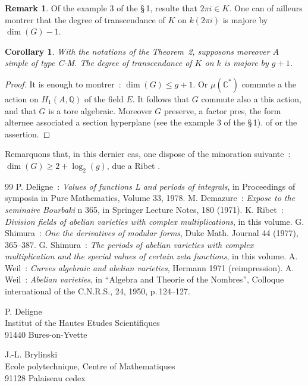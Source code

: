 \documentclass[12pt,a4paper]{article}
\theoremstyle{plain}
\newtheorem{corollary}{Corollary}
\theoremstyle{definition}
\newtheorem{remark}{Remark}
\theoremstyle{remark}
\newcommand{\QQ}{\mathbb{Q}}
\newcommand{\CC}{\mathbb{C}}
\providecommand{\CC}{\mathbb{C}}
\providecommand{\QQ}{\mathbb{Q}}
\begin{document}
\begin{remark}
Of the example 3 of the \S\,1, resulte that $2\pi i \in K$. One can of ailleurs montrer that the degree of transcendance of $K$ on $k(2\pi i)$ is majore by $\dim(G) - 1$.
\end{remark}

\begin{corollary}
With the notations of the Theorem~2, supposons moreover $A$ simple of type C-M. The degree of transcendance of $K$ on $k$ is majore by $g + 1$.
\end{corollary}

\begin{proof}[Proof]
It is enough to montrer~: $\dim(G) \leq g + 1$. Or $\mu(\CC^*)$ commute a the action on $H_1(A, \QQ)$ of the field $E$. It follows that $G$ commute also a this action, and that $G$ is a tore algebraic. Moreover $G$ preserve, a factor pres, the form alternee associated a section hyperplane (see the example 3 of the \S\,1). of or the assertion.
\end{proof}

Remarquons that, in this dernier cas, one dispose of the minoration suivante~: $\dim(G) \geq 2 + \log_2(g)$, due a Ribet \cite{Ribet}.

\begin{thebibliography}{99}
 P. Deligne~: \textit{Values of functions L and periods of integrals}, in Proceedings of symposia in Pure Mathematics, Volume 33, 1978.
 M. Demazure~: \textit{Expose to the seminaire Bourbaki} n 365, in Springer Lecture Notes, 180 (1971).
 K. Ribet~: \textit{Division fields of abelian varieties with complex multiplications}, in this volume.
 G. Shimura~: \textit{One the derivatives of modular forms}, Duke Math. Journal 44 (1977), 365--387.
 G. Shimura~: \textit{The periods of abelian varieties with complex multiplication and the special values of certain zeta functions}, in this volume.
 A. Weil~: \textit{Curves algebraic and abelian varieties}, Hermann 1971 (reimpression).
 A. Weil~: \textit{Abelian varieties}, in ``Algebra and Theorie of the Nombres'', Colloque international of the C.N.R.S., 24, 1950, p.\,124--127.
\end{thebibliography}

\vfill

\begin{flushright}
\begin{minipage}{0.5\textwidth}
\small
P. Deligne\\
Institut of the Hautes Etudes Scientifiques\\
91440 Bures-on-Yvette
\end{minipage}
\end{flushright}

\begin{flushright}
\begin{minipage}{0.5\textwidth}
\small
J.-L. Brylinski\\
Ecole polytechnique, Centre of Mathematiques\\
91128 Palaiseau cedex
\end{minipage}
\end{flushright}
\end{document}
